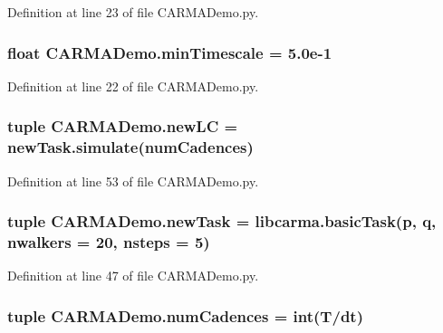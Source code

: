 Definition at line 23 of file C\-A\-R\-M\-A\-Demo.\-py.

\hypertarget{namespace_c_a_r_m_a_demo_a0168215deb3ab933fe96dc4b55388cee}{
\subsubsection[{min\-Timescale}]{\setlength{\rightskip}{0pt plus 5cm}float C\-A\-R\-M\-A\-Demo.\-min\-Timescale = 5.\-0e-\/1}}\label{namespace_c_a_r_m_a_demo_a0168215deb3ab933fe96dc4b55388cee}


Definition at line 22 of file C\-A\-R\-M\-A\-Demo.\-py.

\hypertarget{namespace_c_a_r_m_a_demo_a00f90358447346616f81cdf0ba8454e2}{
\subsubsection[{new\-L\-C}]{\setlength{\rightskip}{0pt plus 5cm}tuple C\-A\-R\-M\-A\-Demo.\-new\-L\-C = new\-Task.\-simulate({\bf num\-Cadences})}}\label{namespace_c_a_r_m_a_demo_a00f90358447346616f81cdf0ba8454e2}


Definition at line 53 of file C\-A\-R\-M\-A\-Demo.\-py.

\hypertarget{namespace_c_a_r_m_a_demo_a8303626832dad7b21c7f02d3bcd0f092}{
\subsubsection[{new\-Task}]{\setlength{\rightskip}{0pt plus 5cm}tuple C\-A\-R\-M\-A\-Demo.\-new\-Task = libcarma.\-basic\-Task({\bf p}, {\bf q}, nwalkers = 20, nsteps = 5)}}\label{namespace_c_a_r_m_a_demo_a8303626832dad7b21c7f02d3bcd0f092}


Definition at line 47 of file C\-A\-R\-M\-A\-Demo.\-py.

\hypertarget{namespace_c_a_r_m_a_demo_a0bf150d4bd0d4b119fbe66ea9a3f5ebc}{
\subsubsection[{num\-Cadences}]{\setlength{\rightskip}{0pt plus 5cm}tuple C\-A\-R\-M\-A\-Demo.\-num\-Cadences = int({\bf T}/{\bf dt})}}\label{namespace_c_a_r_m_a_demo_a0bf150d4bd0d4b119fbe66ea9a3f5ebc}


